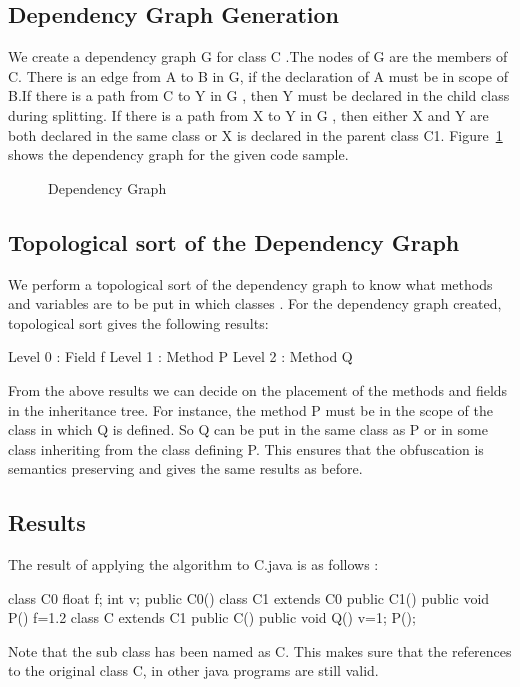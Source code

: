 \subsection{Dependency Graph Generation}
We create a dependency graph G for class C .The nodes of G are the members of C. There is an edge from A to B in G, if the declaration of A must be in scope of B.If there is a path from C to Y in G , then Y must be declared in the child class during splitting. If there is a path from X to Y in G , then either X and Y are both declared in the same class or X is declared in the parent class C1.
Figure~\ref{dep} shows the dependency graph for the given code sample.
\begin{figure}
\begin{center}

\end{center}
\caption{Dependency Graph}
\label{dep}
\end{figure}


\subsection{Topological sort of the Dependency Graph}
We perform a topological sort of the dependency graph to know what methods and variables are to be put in which classes .
For the dependency graph created, topological sort gives the following results:
\begin{listing}{1}
Level 0 : Field f
Level 1 : Method P
Level 2 : Method Q
\end{listing}

From the above results we can decide on the placement of the methods and fields in the inheritance tree. For instance, the method P must be in the scope of the class in which Q is defined. So Q can be put in the same class as P or in some class inheriting from the class defining P. This ensures that the obfuscation is semantics preserving and gives the same results as before.

\subsection{Results}
The result of applying the algorithm to C.java is as follows :
\begin{listing}{1}
class C0 {
        float f;
        int v;
        public C0() { }
 }
class C1 extends C0 {
        public C1() { }
        public void P() {
         f=1.2
         }
 }
class C extends C1 {
        public C() { }
        public void Q() {
          v=1;
          P();
        }
 }
\end{listing}
 Note that the sub class has been named as C. This makes sure that the references to the original class C, in other java programs are still valid.

